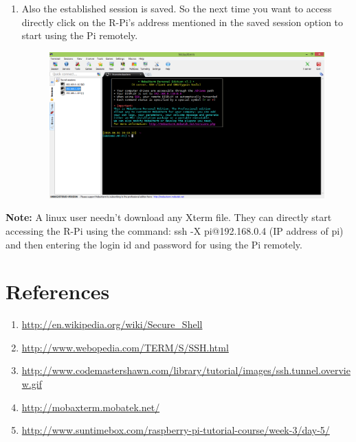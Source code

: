 \documentclass[11pt,a4paper]{article}
\begin{document}
\begin{enumerate}
\begin{figure}[h]
			\centering
		\end{figure}
		\newpage
		\item Also the established session is saved. So the next time you want to access directly click on the R-Pi's address mentioned in the saved session option to start using the Pi remotely.
		\begin{figure}[h!]
			\includegraphics[scale=0.3]{M5.PNG}
			\centering
		\end{figure}
	\end{enumerate}

	\textbf{Note:} A linux user needn't download any Xterm file. They can directly start accessing the R-Pi using the command: ssh -X pi@192.168.0.4 (IP address of pi) and then entering the login id and password for using the Pi remotely.
	
	\newpage
	\section{References}
	\begin{enumerate}
		\item \url{http://en.wikipedia.org/wiki/Secure_Shell}
		\item \url{http://www.webopedia.com/TERM/S/SSH.html}
		\item \url{http://www.codemastershawn.com/library/tutorial/images/ssh.tunnel.overview.gif}
		\item \url{http://mobaxterm.mobatek.net/}
		\item \url{http://www.suntimebox.com/raspberry-pi-tutorial-course/week-3/day-5/}
	\end{enumerate}
\end{document}
